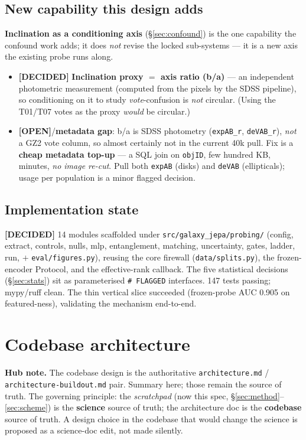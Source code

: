 \documentclass[11pt,a4paper]{article}
\newcommand{\dec}{\textcolor{decided}{\sffamily\bfseries[DECIDED]}}
\newcommand{\opn}{\textcolor{openq}{\sffamily\bfseries[OPEN]}}
\begin{document}
\subsection{New capability this design adds}
\textbf{Inclination as a conditioning axis} (\S\ref{sec:confound}) is the one capability the
confound work adds; it does \emph{not} revise the locked sub-systems --- it is a new axis the
existing probe runs along.
\begin{itemize}[leftmargin=1.4em,itemsep=2pt]
\item \dec{} \textbf{Inclination proxy $=$ axis ratio (b/a)} --- an independent photometric
measurement (computed from the pixels by the SDSS pipeline), so conditioning on it to study
\emph{vote}-confusion is \emph{not} circular. (Using the T01/T07 votes as the proxy \emph{would}
be circular.)
\item \opn{}/\textbf{metadata gap}: b/a is SDSS photometry (\texttt{expAB\_r},
\texttt{deVAB\_r}), \emph{not} a GZ2 vote column, so almost certainly not in the current 40k
pull. Fix is a \textbf{cheap metadata top-up} --- a SQL join on \texttt{objID}, few hundred KB,
minutes, \emph{no image re-cut}. Pull both \texttt{expAB} (disks) and \texttt{deVAB}
(ellipticals); usage per population is a minor flagged decision.
\end{itemize}

\subsection{Implementation state}
\dec{} 14 modules scaffolded under \texttt{src/galaxy\_jepa/probing/} (config, extract, controls,
nulls, mlp, entanglement, matching, uncertainty, gates, ladder, run, $+$ \texttt{eval/figures.py}),
reusing the core firewall (\texttt{data/splits.py}), the frozen-encoder Protocol, and the
effective-rank callback. The five statistical decisions (\S\ref{sec:stats}) sit as parameterised
\texttt{\#~FLAGGED} interfaces. 147 tests passing; mypy/ruff clean. The thin vertical slice
succeeded (frozen-probe AUC 0.905 on featured-ness), validating the mechanism end-to-end.

\section{Codebase architecture}\label{sec:arch}

\begin{decidedbox}
\textbf{Hub note.} The codebase design is the authoritative \texttt{architecture.md} /
\texttt{architecture-buildout.md} pair. Summary here; those remain the source of truth. The
governing principle: the \emph{scratchpad} (now this spec, \S\ref{sec:method}--\ref{sec:scheme})
is the \textbf{science} source of truth; the architecture doc is the \textbf{codebase} source of
truth. A design choice in the codebase that would change the science is proposed as a
science-doc edit, not made silently.
\end{decidedbox}
\end{document}
